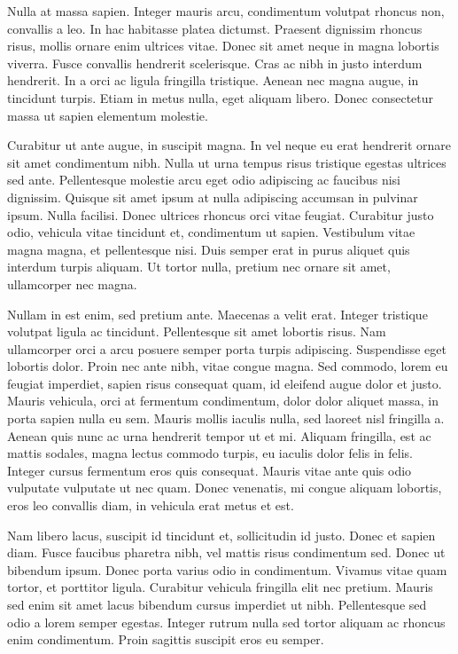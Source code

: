 Nulla at massa sapien. Integer mauris arcu, condimentum volutpat rhoncus non, convallis a leo. In hac habitasse platea dictumst. Praesent dignissim rhoncus risus, mollis ornare enim ultrices vitae. Donec sit amet neque in magna lobortis viverra. Fusce convallis hendrerit scelerisque. Cras ac nibh in justo interdum hendrerit. In a orci ac ligula fringilla tristique. Aenean nec magna augue, in tincidunt turpis. Etiam in metus nulla, eget aliquam libero. Donec consectetur massa ut sapien elementum molestie.

Curabitur ut ante augue, in suscipit magna. In vel neque eu erat hendrerit ornare sit amet condimentum nibh. Nulla ut urna tempus risus tristique egestas ultrices sed ante. Pellentesque molestie arcu eget odio adipiscing ac faucibus nisi dignissim. Quisque sit amet ipsum at nulla adipiscing accumsan in pulvinar ipsum. Nulla facilisi. Donec ultrices rhoncus orci vitae feugiat. Curabitur justo odio, vehicula vitae tincidunt et, condimentum ut sapien. Vestibulum vitae magna magna, et pellentesque nisi. Duis semper erat in purus aliquet quis interdum turpis aliquam. Ut tortor nulla, pretium nec ornare sit amet, ullamcorper nec magna.

Nullam in est enim, sed pretium ante. Maecenas a velit erat. Integer tristique volutpat ligula ac tincidunt. Pellentesque sit amet lobortis risus. Nam ullamcorper orci a arcu posuere semper porta turpis adipiscing. Suspendisse eget lobortis dolor. Proin nec ante nibh, vitae congue magna. Sed commodo, lorem eu feugiat imperdiet, sapien risus consequat quam, id eleifend augue dolor et justo. Mauris vehicula, orci at fermentum condimentum, dolor dolor aliquet massa, in porta sapien nulla eu sem. Mauris mollis iaculis nulla, sed laoreet nisl fringilla a. Aenean quis nunc ac urna hendrerit tempor ut et mi. Aliquam fringilla, est ac mattis sodales, magna lectus commodo turpis, eu iaculis dolor felis in felis. Integer cursus fermentum eros quis consequat. Mauris vitae ante quis odio vulputate vulputate ut nec quam. Donec venenatis, mi congue aliquam lobortis, eros leo convallis diam, in vehicula erat metus et est.

Nam libero lacus, suscipit id tincidunt et, sollicitudin id justo. Donec et sapien diam. Fusce faucibus pharetra nibh, vel mattis risus condimentum sed. Donec ut bibendum ipsum. Donec porta varius odio in condimentum. Vivamus vitae quam tortor, et porttitor ligula. Curabitur vehicula fringilla elit nec pretium. Mauris sed enim sit amet lacus bibendum cursus imperdiet ut nibh. Pellentesque sed odio a lorem semper egestas. Integer rutrum nulla sed tortor aliquam ac rhoncus enim condimentum. Proin sagittis suscipit eros eu semper.

